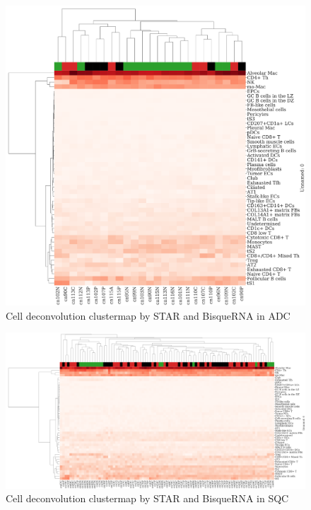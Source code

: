 \documentclass[11pt,a4paper,onecolumn,oneside]{report}
\begin{document}
                \begin{figure}[p]
                    \centering
                    \includegraphics[width=0.6 \linewidth]{figures/BisqueRNA/clustermap/STAR.ADC.cluster.pdf}
                    \caption{Cell deconvolution clustermap by STAR and BisqueRNA in ADC}
                    \label{fig:Deconvolution-BisqueRNA-STAR-cluster-ADC}
                \end{figure}

                \begin{figure}[p]
                    \centering
                    \includegraphics[width=\linewidth]{figures/BisqueRNA/clustermap/STAR.SQC.cluster.pdf}
                    \caption{Cell deconvolution clustermap by STAR and BisqueRNA in SQC}
                    \label{fig:Deconvolution-BisqueRNA-STAR-cluster-SQC}
                \end{figure}
\end{document}

